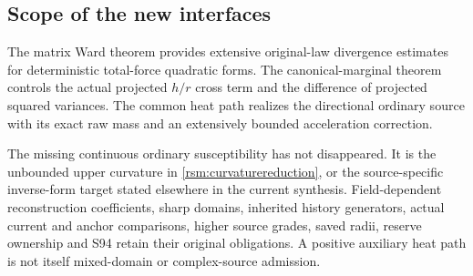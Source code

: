 \subsection{Scope of the new interfaces}

The matrix Ward theorem provides extensive original-law divergence estimates for deterministic total-force quadratic forms. The canonical-marginal theorem controls the actual projected \(h/r\) cross term and the difference of projected squared variances. The common heat path realizes the directional ordinary source with its exact raw mass and an extensively bounded acceleration correction.

The missing continuous ordinary susceptibility has not disappeared. It is the unbounded upper curvature in \eqref{rsm:curvaturereduction}, or the source-specific inverse-form target stated elsewhere in the current synthesis. Field-dependent reconstruction coefficients, sharp domains, inherited history generators, actual current and anchor comparisons, higher source grades, saved radii, reserve ownership and S94 retain their original obligations. A positive auxiliary heat path is not itself mixed-domain or complex-source admission.
